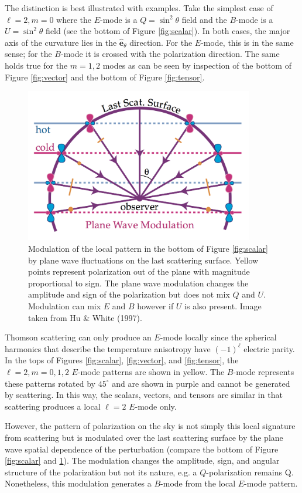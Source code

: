 \documentclass[a4paper,11pt]{article}
\begin{document}
{\noindent}The distinction is best illustrated with examples. Take the simplest case of $\ell=2,m=0$ where the $E$-mode is a $Q=\sin^2\theta$ field and the $B$-mode is a $U=\sin^2\theta$ field (see the bottom of Figure \ref{fig:scalar}). In both cases, the major axis of the curvature lies in the $\bm{\hat{e}}_\theta$ direction. For the $E$-mode, this is in the same sense; for the $B$-mode it is crossed with the polarization direction. The same holds true for the $m=1,2$ modes as can be seen by inspection of the bottom of Figure \ref{fig:vector} and the bottom of Figure \ref{fig:tensor}.

\begin{figure}[t!]
    \centering
    \includegraphics[width=10cm]{figures/CMBquad.png}
    \caption{\footnotesize{Modulation of the local pattern in the bottom of Figure \ref{fig:scalar} by plane wave fluctuations on the last scattering surface. Yellow points represent polarization out of the plane with magnitude proportional to sign. The plane wave modulation changes the amplitude and sign of the polarization but does not mix $Q$ and $U$. Modulation can mix $E$ and $B$ however if $U$ is also present. Image taken from Hu \& White (1997).}}
    \label{fig:cmbquad}
\end{figure}

{\noindent}Thomson scattering can only produce an $E$-mode locally since the spherical harmonics that describe the temperature anisotropy have $(-1)^\ell$ electric parity. In the tops of Figures \ref{fig:scalar}, \ref{fig:vector}, and \ref{fig:tensor}, the $\ell=2,m=0,1,2$ $E$-mode patterns are shown in yellow. The $B$-mode represents these patterns rotated by $45^\circ$ and are shown in purple and cannot be generated by scattering. In this way, the scalars, vectors, and tensors are similar in that scattering produces a local $\ell=2$ $E$-mode only.

{\noindent}However, the pattern of polarization on the sky is not simply this local signature from scattering but is modulated over the last scattering surface by the plane wave spatial dependence of the perturbation (compare the bottom of Figure \ref{fig:scalar} and \ref{fig:cmbquad}). The modulation changes the amplitude, sign, and angular structure of the polarization but not its nature, e.g. a $Q$-polarization remains Q. Nonetheless, this modulation generates a $B$-mode from the local $E$-mode pattern.
\end{document}
